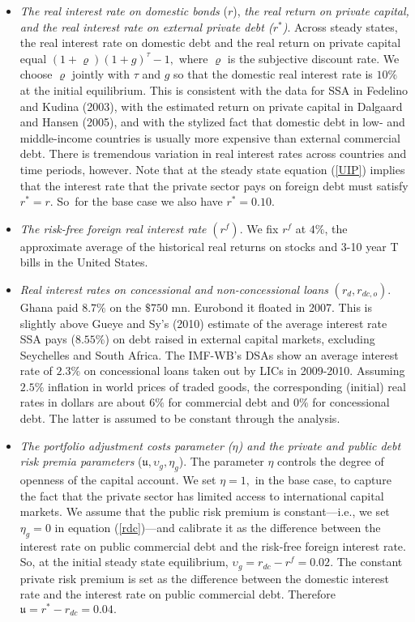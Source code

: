 \documentclass[11pt]{article}
\begin{document}
\begin{itemize}
\item \textit{The real interest rate on domestic bonds }($r$), \textit{the
real return on private capital, and the real interest rate on external
private debt (}$r^{\ast }$\textit{)}. Across steady states, the real
interest rate on domestic debt and the real return on private capital equal $%
(1+\varrho )(1+g)^{\tau }-1,$ where $\varrho $ is the subjective discount
rate. We choose $\varrho $ jointly with $\tau $ and $g$ so that the domestic
real interest rate is $10\%$ at the initial equilibrium. This is consistent
with the data for SSA in Fedelino and Kudina (2003), with the estimated
return on private capital in Dalgaard and Hansen (2005), and with the
stylized fact that domestic debt in low- and middle-income countries is
usually more expensive than external commercial debt. There is tremendous
variation in real interest rates across countries and time periods, however.
Note that at the steady state equation (\ref{UIP}) implies that the interest
rate that the private sector pays on foreign debt must satisfy $r^{\ast }=r.$
So\ for the base case we also have $r^{\ast }=0.10.$

\item \textit{The risk-free foreign real interest rate }$(r^{f})$. We fix $%
r^{f}$ at $4\%$, the approximate average of the historical real returns on
stocks and 3-10 year T bills in the United States.

\item \textit{Real interest rates on concessional and non-concessional loans 
}$(r_{d},r_{dc,o})$. Ghana paid $8.7\%$ on the $\$750$ mn.\thinspace
Eurobond it floated in 2007. This is slightly above Gueye and Sy's (2010)
estimate of the average interest rate SSA pays ($8.55\%$) on debt raised in
external capital markets, excluding Seychelles and South Africa. The
IMF-WB's DSAs show an average interest rate of $2.3\%$ on concessional loans
taken out by LICs in 2009-2010. Assuming $2.5\%$ inflation in world prices
of traded goods, the corresponding (initial) real rates in dollars are about 
$6\%$ for commercial debt and $0\%$ for concessional debt. The latter is
assumed to be constant through the analysis.

\item \textit{The portfolio adjustment costs parameter (}$\eta $\textit{)
and the private and public debt risk premia parameters} ($\mathfrak{u,}%
\upsilon _{g},\eta _{g}$). The parameter $\eta $ controls the degree of
openness of the capital account. We set $\eta =1,$ in the base case, to
capture the fact that the private sector has limited access to international
capital markets. We assume that the public risk premium is constant---i.e.,
we set $\eta _{g}=0$ in equation (\ref{rdc})---and calibrate it as the
difference between the interest rate on public commercial debt and the
risk-free foreign interest rate. So, at the initial steady state
equilibrium, $\upsilon _{g}=r_{dc}-r^{f}=0.02.$ The constant private risk
premium is set as the difference between the domestic interest rate and the
interest rate on public commercial debt. Therefore $\mathfrak{u}=r^{\ast
}-r_{dc}=0.04.$


\end{itemize}
\end{document}
